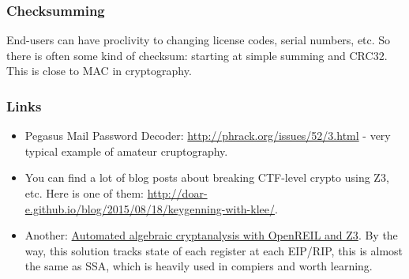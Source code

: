 \subsubsection{Checksumming}

End-users can have proclivity to changing license codes, serial numbers, etc.
So there is often some kind of checksum: starting at simple summing and CRC32.
This is close to \ac{MAC} in cryptography.

\subsubsection{Links}

\begin{itemize}

\item Pegasus Mail Password Decoder: \url{http://phrack.org/issues/52/3.html} -
very typical example of amateur cruptography.

\item You can find a lot of blog posts about breaking CTF-level crypto using Z3, etc.
Here is one of them: \url{http://doar-e.github.io/blog/2015/08/18/keygenning-with-klee/}.

\item Another: \href{http://blog.cr4.sh/2015/03/automated-algebraic-cryptanalysis-with.html}{Automated algebraic cryptanalysis with OpenREIL and Z3}.
By the way, this solution tracks state of each register at each EIP/RIP, this is almost the same as \ac{SSA}, which is heavily used in compiers and worth learning.

\end{itemize}



